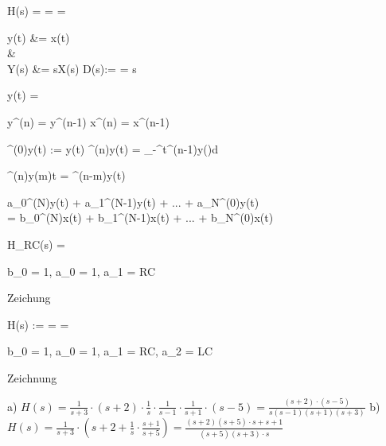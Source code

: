 \begin{abox}
	H(s) =  =  = 
\end{abox}

\begin{abox}
	y(t) &= x(t)\\
	& \ztrans\\
	Y(s) &= s\cdot X(s) \implies D(s):=  = s
\end{abox}

\begin{abox}
	y(t) =
\end{abox}


\begin{abox}
	y^{(n)} = y^{(n-1)} \quad {} \quad x^{(n)} = x^{(n-1)}
\end{abox}


\begin{abox}
	\int^{(0)}y(t) := y(t)  \int^{(n)}y(t) = \int_{-\infty}^{t}\int^{(n-1)}y(\tau)d\tau
\end{abox}

\begin{abox}
	\int^{(n)}y(m)t = \int^{(n-m)}y(t)
\end{abox}

\begin{abox}
	a_0\int^{(N)}y(t) + a_1\int^{(N-1)}y(t) + ... + a_N\int^{(0)}y(t)\\
	= b_0\int^{(N)}x(t) + b_1\int^{(N-1)}x(t) + ... + b_N\int^{(0)}x(t)
\end{abox}

\begin{abox}
	H_{RC}(s) = 
\end{abox}

\begin{abox}
	b_0 = 1, a_0 = 1, a_1 = RC
\end{abox}

\begin{abox}
	Zeichung
\end{abox}

\begin{abox}
	H(s) :=  =  = 
\end{abox}

\begin{abox}
	b_0 = 1, a_0 = 1, a_1 = RC, a_2 = LC
\end{abox}

\begin{abox}
	Zeichnung
\end{abox}


\setcounter{BoxCounter}{289}
\begin{tbox}
	a) $ H(s) = \frac{1}{s+3} \cdot (s+2) \cdot \frac{1}{s} \cdot \frac{1}{s-1} \cdot \frac{1}{s+1} \cdot (s-5) = \frac{(s+2) \cdot (s-5)}{s(s-1)(s+1)(s+3)}$
	b)$ H(s) = \frac{1}{s+3}\cdot \left(s+2+\frac{1}{s}\cdot \frac{s+1}{s+5}\right) = \frac{(s+2)(s+5)\cdot s + s+ 1}{(s+5)(s+3)\cdot s}$
\end{tbox}
